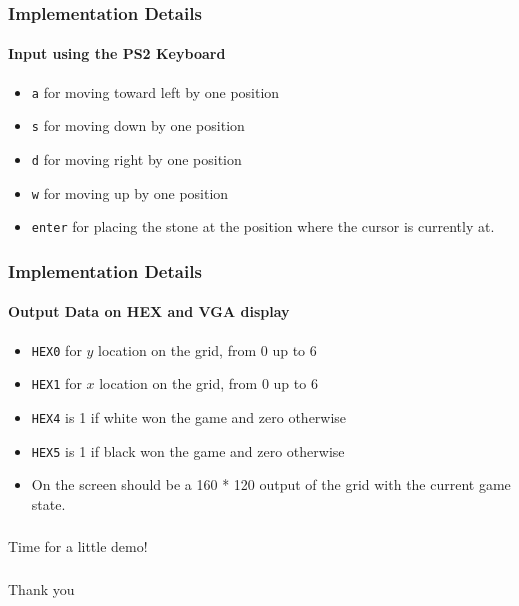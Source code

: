 \documentclass{beamer}
\begin{document}
\begin{frame}
    \frametitle{Implementation Details}
    \framesubtitle{Input using the PS2 Keyboard}
    \begin{itemize}
        \item \texttt{a} for moving toward left by one position
        \item \texttt{s} for moving down by one position
        \item \texttt{d} for moving right by one position
        \item \texttt{w} for moving up by one position
        \item \texttt{enter} for placing the stone at the position where the cursor is currently at.
        
    \end{itemize}
\end{frame}

\begin{frame}
    \frametitle{Implementation Details}
    \framesubtitle{Output Data on HEX and VGA display}
    \begin{itemize}
        \item \texttt{HEX0} for $y$ location on the grid, from 0 up to 6
        \item \texttt{HEX1} for $x$ location on the grid, from 0 up to 6
        \item \texttt{HEX4} is 1 if white won the game and zero otherwise
        \item \texttt{HEX5} is 1 if black won the game and zero otherwise 
        \item On the screen should be a 160 * 120 output of the grid with the current game state. 
    \end{itemize}
\end{frame}


\begin{frame}
    \frametitle{}
    \center \LARGE Time for a little demo!
\end{frame}

\begin{frame}
    \frametitle{}
    \center \LARGE Thank you
\end{frame}
\end{document}
